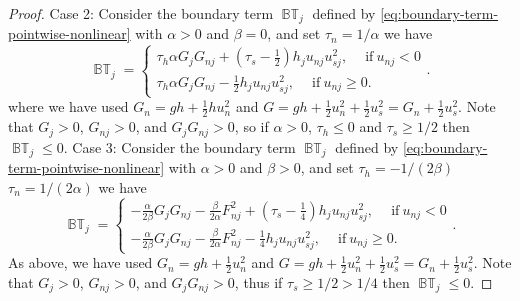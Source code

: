 \documentclass[10pt,a4paper]{amsart}
\begin{document}
\begin{proof}
\noindent
Case 2:
    Consider the boundary term  $\operatorname{\mathbb{BT}}_j$ defined by \eqref{eq:boundary-term-pointwise-nonlinear} with $\alpha> 0$ and $\beta =0 $, and set $\tau_n = 1/\alpha$
     we have
     $$
      \operatorname{\mathbb{BT}}_j =
\begin{cases}
     \tau_h \alpha G_{j}  G_{nj}  + 
    \left(\tau_s -\frac{1}{2}\right)h_ju_{nj}u_{sj}^2 , \quad \ \text{if} \ u_{nj} < 0\\
%     
 \tau_h \alpha G_{j}  G_{nj}  
     -\frac{1}{2}h_ju_{nj}u_{sj}^2, \quad \ \text{if} \ u_{nj} \ge  0.
     \end{cases}.
     $$
where we have used
$
G_n = gh + \frac{1}{2}hu_n^2 
$
and 
$G = gh + \frac{1}{2}u_n^2 + \frac{1}{2}u_s^2  = G_n + \frac{1}{2}u_s^2 $.
Note that $G_{j} >0$,  $G_{nj} >0$, and $G_{j}  G_{nj} >0 $, so if $\alpha >0$, $\tau_h \le 0$ and $\tau_s \ge 1/2$ then $\operatorname{\mathbb{BT}}_j \le 0$.
\newline
\newline
\noindent
Case 3:
    Consider the boundary term  $\operatorname{\mathbb{BT}}_j$ defined by \eqref{eq:boundary-term-pointwise-nonlinear} with $\alpha> 0$ and $\beta >0 $, and set $\tau_h = -1/(2\beta)$ $\tau_n = 1/(2\alpha)$
     we have
     $$
      \operatorname{\mathbb{BT}}_j =
\begin{cases}
      -\frac{\alpha}{2\beta} G_{j}  G_{nj}  - \frac{\beta}{2\alpha} F_{nj}^2 + 
    \left(\tau_s -\frac{1}{4}\right)h_ju_{nj}u_{sj}^2 , \quad \ \text{if} \ u_{nj} < 0\\
%     
-\frac{\alpha}{2\beta} G_{j}  G_{nj}  - \frac{\beta}{2\alpha} F_{nj}^2  
     -\frac{1}{4}h_ju_{nj}u_{sj}^2, \quad \ \text{if} \ u_{nj} \ge  0.
     \end{cases}.
     $$
As above, we have used
$
G_n = gh + \frac{1}{2}u_n^2 
$
and 
$G = gh + \frac{1}{2}u_n^2 + \frac{1}{2}u_s^2  = G_n + \frac{1}{2}u_s^2 $.
Note that $G_{j} >0$,  $G_{nj} >0$, and $G_{j}  G_{nj} >0 $, thus if  $\tau_s \ge 1/2 > 1/4$ then $\operatorname{\mathbb{BT}}_j \le 0$.
\end{proof}
\end{document}
